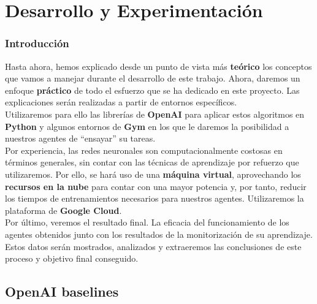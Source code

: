 \documentclass[11pt,fleqn]{book} %
\begin{document}


\part{Desarrollo y Experimentación}

\section*{Introducción}\label{sec:introduccionexp}

Hasta ahora, hemos explicado desde un punto de vista más \textbf{teórico} los conceptos que vamos a manejar durante el desarrollo de este trabajo. Ahora, daremos un enfoque \textbf{práctico} de todo el esfuerzo que se ha dedicado en este proyecto. Las explicaciones serán realizadas a partir de entornos específicos. \\

Utilizaremos para ello las librerías de \textbf{OpenAI} para aplicar estos algoritmos en \textbf{Python} y algunos entornos de \textbf{Gym} en los que le daremos la posibilidad a nuestros agentes de ``ensayar'' su tareas. \\

Por experiencia, las redes neuronales son computacionalmente costosas en términos generales, sin contar con las técnicas de aprendizaje por refuerzo que utilizaremos. Por ello, se hará uso de una \textbf{máquina virtual}, aprovechando los \textbf{recursos en la nube} para contar con una mayor potencia y, por tanto, reducir los tiempos de entrenamientos necesarios para nuestros agentes. Utilizaremos la plataforma de \textbf{Google Cloud}. \\

Por último, veremos el resultado final. La eficacia del funcionamiento de los agentes obtenidos junto con los resultados de la monitorización de su aprendizaje. Estos datos serán mostrados, analizados y extraeremos las conclusiones de este proceso y objetivo final conseguido.

\chapter{OpenAI baselines}\label{sec:DRL}
\end{document}
